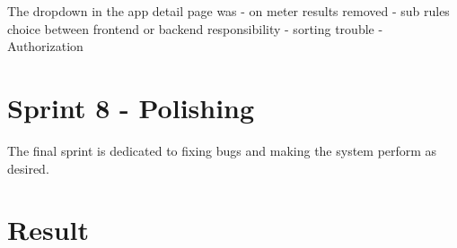 The dropdown in the app detail page was
- on meter results removed
- sub rules choice between frontend or backend responsibility
- sorting trouble
- Authorization

%
\section{Sprint 8 - Polishing}
The final sprint is dedicated to fixing bugs and making the system perform as desired.



%
\section{Result}
